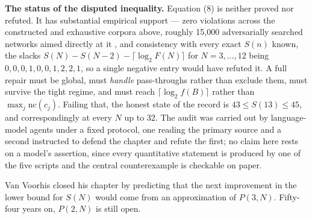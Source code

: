 \documentclass[11pt,a4paper]{article}
\newcommand{\nc}{\mathrm{nc}}
\begin{document}
\textbf{The status of the disputed inequality.} Equation (8) is neither proved
nor refuted. It has substantial empirical support --- zero violations across the
constructed and exhaustive corpora above, roughly 15{,}000 adversarially
searched networks aimed directly at it \cite{Art}, and consistency with every exact $S(n)$
known, the slacks $S(N) - S(N-2) - \lceil\log_2 F(N)\rceil$ for $N = 3,\dots,12$
being $0,0,0,1,0,0,1,2,2,1$, so a single negative entry would have refuted it. A
full repair must be global, must \emph{handle} pass-throughs rather than exclude
them, must survive the tight regime, and must reach $\lceil\log_2 f(B)\rceil$
rather than $\max_j \nc(c_j)$. Failing that, the honest state of the record is
$43 \le S(13) \le 45$, and correspondingly at every $N$ up to 32. The audit was
carried out by language-model agents under a fixed protocol, one reading the
primary source and a second instructed to defend the chapter and refute the
first; no claim here rests on a model's assertion, since every quantitative
statement is produced by one of the five scripts and the central counterexample
is checkable on paper.

Van Voorhis closed his chapter by predicting that the next improvement in the
lower bound for $S(N)$ would come from an approximation of $P(3,N)$. Fifty-four
years on, $P(2,N)$ is still open.
\end{document}
